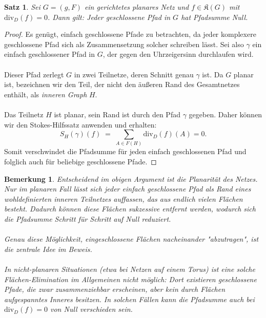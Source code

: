 \documentclass[11pt,a4paper,leqno]{report}
\newtheorem{proposition}{Satz}[chapter]
\newtheorem{remark}[theorem]{Bemerkung}
\numberwithin{equation}{chapter}
\begin{document}
\begin{proposition}
	Sei $G=(g,F)$ ein gerichtetes planares Netz und $f \in \mathfrak{K}(G)$ mit $\mathrm{div}_D(f)=0$. 
	Dann gilt: Jeder geschlossene Pfad in $G$ hat Pfadsumme Null.
\end{proposition}
\begin{proof}
	Es genügt, einfach geschlossene Pfade zu betrachten, da jeder komplexere geschlossene Pfad sich als Zusammensetzung solcher schreiben lässt.
	Sei also $\gamma$ ein einfach geschlossener Pfad in $G$, der gegen den Uhrzeigersinn durchlaufen wird.\\
	\\
	Dieser Pfad zerlegt $G$ in zwei Teilnetze, deren Schnitt genau $\gamma$ ist.
	Da $G$ planar ist, bezeichnen wir den Teil, der nicht den äußeren Rand des Gesamtnetzes enthält, als \emph{inneren Graph} $H$.\\
	\\
	Das Teilnetz $H$ ist planar, sein Rand ist durch den Pfad $\gamma$ gegeben.
	Daher können wir den Stokes-Hilfssatz anwenden und erhalten:
	\begin{equation}
		S_H(\gamma)(f) \;=\; \sum_{A \in F(H)} \mathrm{div}_D(f)(A) = 0.
	\end{equation}
	Somit verschwindet die Pfadsumme für jeden einfach geschlossenen Pfad und folglich auch für beliebige geschlossene Pfade.
\end{proof}
\noindent
\begin{remark}
	Entscheidend im obigen Argument ist die \emph{Planarität} des Netzes. 
	Nur im planaren Fall lässt sich jeder einfach geschlossene Pfad als Rand 
	eines wohldefinierten inneren Teilnetzes auffassen, das aus endlich vielen 
	Flächen besteht. Dadurch können diese Flächen sukzessive entfernt werden, 
	wodurch sich die Pfadsumme Schritt für Schritt auf Null reduziert. \\
	\\
	Genau diese Möglichkeit, eingeschlossene Flächen nacheinander 
	"abzutragen", ist die zentrale Idee im Beweis. \\
	\\
	In nicht-planaren Situationen (etwa bei Netzen auf einem Torus) ist eine solche 
	Flächen-Elimination im Allgemeinen nicht möglich: Dort existieren geschlossene 
	Pfade, die zwar zusammenziehbar erscheinen, aber kein durch Flächen aufgespanntes 
	Inneres besitzen. In solchen Fällen kann die Pfadsumme auch bei 
	$\mathrm{div}_D(f)=0$ von Null verschieden sein.
\end{remark}
\noindent
\end{document}
